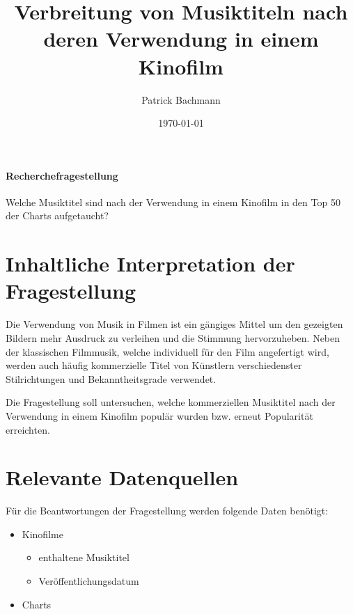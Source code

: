 \documentclass[parskip]{scrartcl}
\begin{document}
\subject{Projektdokumentation im Modul Semantic Web}

\title{Verbreitung von Musiktiteln nach deren Verwendung in einem Kinofilm}

\author{Patrick Bachmann}

\date{\today}

\maketitle

\paragraph{Recherchefragestellung}

Welche Musiktitel sind nach der Verwendung in einem Kinofilm in den Top 50 der Charts aufgetaucht?

\section{Inhaltliche Interpretation der Fragestellung}

Die Verwendung von Musik in Filmen ist ein gängiges Mittel um den gezeigten Bildern mehr Ausdruck zu verleihen und die Stimmung hervorzuheben. Neben der klassischen Filmmusik, welche individuell für den Film angefertigt wird, werden auch häufig kommerzielle Titel von Künstlern verschiedenster Stilrichtungen und Bekanntheitsgrade verwendet.

Die Fragestellung soll untersuchen, welche kommerziellen Musiktitel nach der Verwendung in einem Kinofilm populär wurden bzw. erneut Popularität erreichten.

\pagebreak
\section{Relevante Datenquellen}

Für die Beantwortungen der Fragestellung werden folgende Daten benötigt:
\begin{itemize}
    \itemsep 1pt
    \parskip 0pt
    \parsep 0pt
    \item Kinofilme
    \begin{itemize}
            \item enthaltene Musiktitel
            \item Veröffentlichungsdatum
    \end{itemize}
        \item Charts
\end{itemize}
\end{document}
